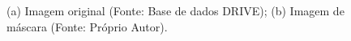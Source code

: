 \begin{figure}[!h]
    \centering
    \caption{(a) Imagem original (Fonte: Base de dados DRIVE); (b) Imagem de m\'{a}scara (Fonte: Pr\'{o}prio Autor).}
    \label{Fig:mascara}
\end{figure}

